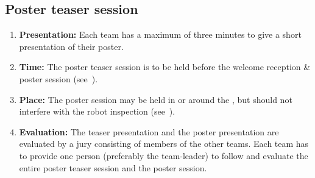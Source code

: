 \subsection{Poster teaser session}
\begin{enumerate}
	\item \textbf{Presentation:} Each team has a maximum of three minutes to give a short presentation of their poster.
	\item \textbf{Time:} The poster teaser session is to be held before the welcome reception \& poster session (see~).
	\item \textbf{Place:} The poster session may be held in or around the \Arena{}, but should not interfere with the robot inspection (see~).
	\item \textbf{Evaluation:} The teaser presentation and the poster presentation are evaluated by a jury consisting of members of the other teams. Each team has to provide one person (preferably the team-leader) to follow
	and evaluate
	the entire poster teaser session and the poster session.


\end{enumerate}
